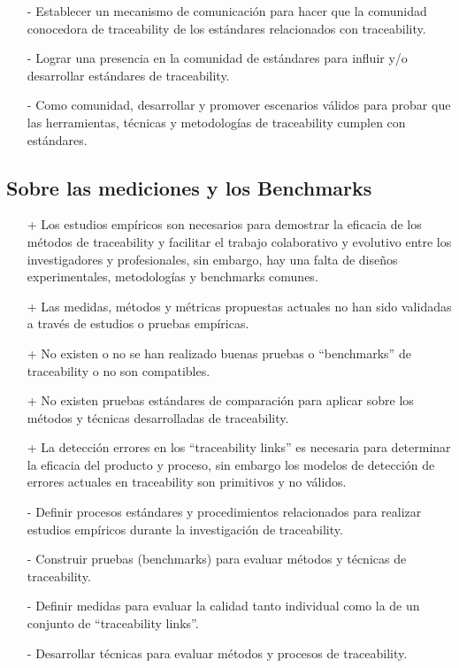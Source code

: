\documentclass[a4paper,12pt,oneside]{book}
\begin{document}
\begin{itemize}
\item[-]     Establecer un mecanismo de comunicación para hacer que la comunidad conocedora de traceability de los estándares relacionados con traceability.
\item[-]    Lograr una presencia en la comunidad de estándares para influir y/o desarrollar estándares de traceability.
\item[-]    Como comunidad, desarrollar y promover escenarios válidos para probar que las herramientas, técnicas y metodologías de traceability cumplen con estándares.
\end{itemize}


\subsection{Sobre las mediciones y los Benchmarks}

\begin{itemize}
\item[+]     Los estudios empíricos son necesarios para demostrar la eficacia de los métodos de traceability y facilitar el trabajo colaborativo y evolutivo entre los investigadores y profesionales, sin embargo, hay una falta de diseños experimentales, metodologías y benchmarks comunes.
\item[+]    Las medidas, métodos y métricas propuestas actuales no han sido validadas a través de estudios o pruebas empíricas.
\item[+]    No existen o no se han realizado buenas pruebas o “benchmarks” de traceability o no son compatibles.
\item[+]    No existen pruebas estándares de comparación para aplicar sobre los métodos y técnicas desarrolladas de traceability.
\item[+]    La detección errores en los “traceability links” es necesaria para determinar la eficacia del producto y proceso, sin embargo los modelos de detección de errores actuales en traceability son primitivos y no válidos.
\end{itemize}

\begin{itemize}
\item[-]     Definir procesos estándares y procedimientos relacionados para realizar estudios empíricos durante la investigación de traceability.
\item[-]    Construir pruebas (benchmarks) para evaluar métodos y técnicas de traceability.
\item[-]    Definir medidas para evaluar la calidad tanto individual como la de un conjunto de “traceability links”.
\item[-]    Desarrollar técnicas para evaluar métodos y procesos de traceability.
\end{itemize}
\end{document}
